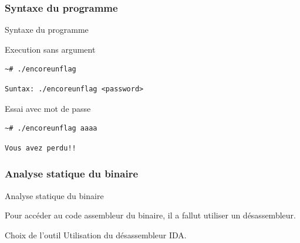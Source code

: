 \documentclass[10pt,sans,usenames,dvipsnames,french,compress]{beamer}
\begin{document}
\subsubsection{Syntaxe du programme}
\begin{frame}[fragile]{Syntaxe du programme}
	\begin{block}{Execution sans argument}
		\vspace{-3mm}
		\begin{lstlisting}[style=Term]
			~# ./encoreunflag
		\end{lstlisting}
		\vspace{-2mm}
	\end{block}
	\begin{block}{}
		\vspace{-3mm}
		\begin{lstlisting}[style=Term]
		      Suntax: ./encoreunflag <password>
		\end{lstlisting}
		\vspace{-2mm}
	\end{block}
		\begin{block}{Essai avec mot de passe}
		\vspace{-3mm}
		\begin{lstlisting}[style=Term]
			~# ./encoreunflag aaaa
		\end{lstlisting}
		\vspace{-2mm}
	\end{block}
	\begin{block}{}
		\vspace{-3mm}
		\begin{lstlisting}[style=Term]
		      Vous avez perdu!!

		\end{lstlisting}
		\vspace{-2mm}
	\end{block}
\end{frame}	


\subsubsection{Analyse statique du binaire}
\begin{frame}[fragile]{Analyse statique du binaire}
	\begin{block}{}
	  Pour accéder au code assembleur du binaire, il a fallut utiliser un désassembleur.
	\end{block}
\begin{exampleblock}{Choix de l'outil}
	  Utilisation du désassembleur IDA.
	\end{exampleblock}
\end{frame}	
\end{document}
